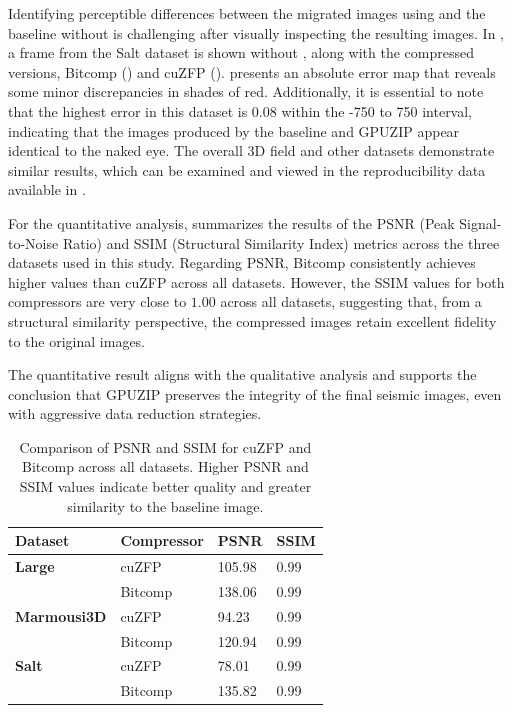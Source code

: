\documentclass[Ingles,Final]{ic-tese-v3}
\begin{document}
Identifying perceptible differences between the migrated images using \compression and the baseline without \compression is challenging after visually inspecting the resulting images. In , a frame from the Salt dataset is shown without \compression, along with the compressed versions, Bitcomp () and cuZFP ().  presents an absolute error map that reveals some minor discrepancies in shades of red. Additionally, it is essential to note that the highest error in this dataset is 0.08 within the -750 to 750 interval, indicating that the images produced by the baseline and GPUZIP appear identical to the naked eye. The overall 3D field and other datasets demonstrate similar results, which can be examined and viewed in the reproducibility data available in \cite{ds}.

For the quantitative analysis,  summarizes the results of the PSNR (Peak Signal-to-Noise Ratio) and SSIM (Structural Similarity Index) metrics across the three datasets used in this study. Regarding PSNR, Bitcomp consistently achieves higher values than cuZFP across all datasets. However, the SSIM values for both compressors are very close to $1.00$ across all datasets, suggesting that, from a structural similarity perspective, the compressed images retain excellent fidelity to the original images.

The quantitative result aligns with the qualitative analysis and supports the conclusion that GPUZIP \compression preserves the integrity of the final seismic images, even with aggressive data reduction strategies.



\begin{table}[h!]
\centering
\begin{tabular}{|l|l|l|l|}
\hline
\rowcolor[HTML]{C0C0C0}
\textbf{Dataset} & \textbf{Compressor} & \textbf{PSNR} & \textbf{SSIM} \\ \hline
\textbf{Large}   & cuZFP      & 105.98  & 0.99  \\ \cline{2-4} 
                 & Bitcomp    & 138.06  & 0.99  \\ \hline
\textbf{Marmousi3D} & cuZFP   & 94.23   & 0.99  \\ \cline{2-4} 
                    & Bitcomp & 120.94  & 0.99  \\ \hline
\textbf{Salt}    & cuZFP      & 78.01   & 0.99  \\ \cline{2-4} 
                 & Bitcomp    & 135.82  & 0.99  \\ \hline
\end{tabular}
\caption[Compression quality assessment]{Comparison of PSNR and SSIM for cuZFP and Bitcomp across all datasets. Higher PSNR and SSIM values indicate better quality and greater similarity to the baseline image.}
\label{tab:quality}
\end{table}
\end{document}
